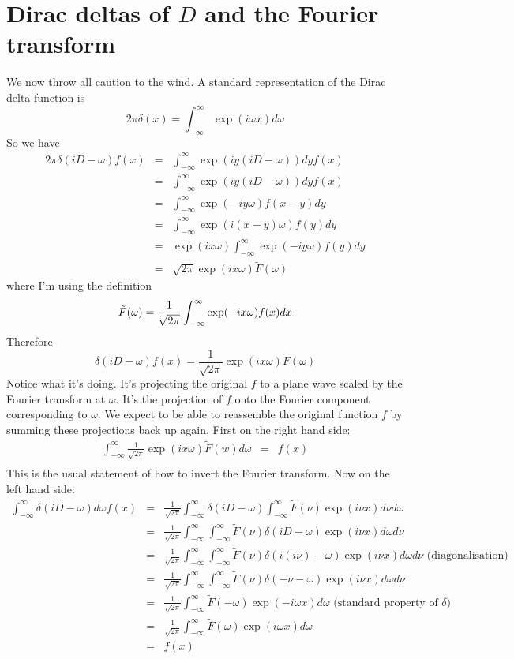 \documentclass[a4paper]{article}
\theoremstyle{definition}
\begin{document}
\section{Dirac deltas of $D$ and the Fourier transform}
We now throw all caution to the wind.
A standard representation of the Dirac delta function is
\[
2\pi\delta(x) = \int_{-\infty}^\infty \exp(i\omega x)d\omega
\]
So we have
\begin{eqnarray*}
2\pi\delta(iD-\omega)f(x) & = & \int_{-\infty}^\infty\exp(iy(iD-\omega))dyf(x) \\
& = & \int_{-\infty}^\infty\exp(iy(iD-\omega))dyf(x) \\
& = & \int_{-\infty}^\infty\exp(-iy\omega)f(x-y)dy \\
& = & \int_{-\infty}^\infty\exp(i(x-y)\omega)f(y)dy \\
& = & \exp(ix\omega)\int_{-\infty}^\infty\exp(-iy\omega)f(y)dy \\
& = & \sqrt{2\pi}\exp(ix\omega)\tilde{F}(\omega)
\end{eqnarray*}
where I'm using the definition
\[
\tilde{F}(\omega) = \frac{1}{\sqrt{2\pi}}\int_{-\infty}^\infty\exp(-ix\omega)f(x)dx \\
\]
Therefore
\[
\delta(iD-\omega)f(x) = \frac{1}{\sqrt{2\pi}}\exp(ix\omega)\tilde{F}(\omega)
\]
Notice what it's doing.
It's projecting the original $f$ to a plane wave scaled by the Fourier transform at $\omega$.
It's the projection of $f$ onto the Fourier component corresponding to $\omega$.
We expect to be able to reassemble the original function $f$ by summing these projections back up again.
First on the right hand side:
\begin{eqnarray*}
\int_{-\infty}^\infty\frac{1}{\sqrt{2\pi}}\exp(ix\omega)\tilde{F}(w)d\omega & = & f(x) \\
\end{eqnarray*}
This is the usual statement of how to invert the Fourier transform.
Now on the left hand side:
\begin{eqnarray*}
\int_{-\infty}^\infty\delta(iD-\omega)d\omega f(x) & = &
\frac{1}{\sqrt{2\pi}}\int_{-\infty}^\infty\delta(iD-\omega)\int_{-\infty}^\infty\tilde{F}(\nu)\exp(i\nu x)d\nu d\omega \\
& = & \frac{1}{\sqrt{2\pi}}\int_{-\infty}^\infty\int_{-\infty}^\infty\tilde{F}(\nu)\delta(iD-\omega)\exp(i\nu x)d\omega d\nu \\
& = & \frac{1}{\sqrt{2\pi}}\int_{-\infty}^\infty\int_{-\infty}^\infty\tilde{F}(\nu)\delta(i(i\nu)-\omega)\exp(i\nu x)d\omega d\nu \mbox{ (diagonalisation)}\\
& = & \frac{1}{\sqrt{2\pi}}\int_{-\infty}^\infty\int_{-\infty}^\infty\tilde{F}(\nu)\delta(-\nu-\omega)\exp(i\nu x)d\omega d\nu \\
& = & \frac{1}{\sqrt{2\pi}}\int_{-\infty}^\infty\tilde{F}(-\omega)\exp(-i\omega x)d\omega \mbox{ (standard property of $\delta$)} \\
& = & \frac{1}{\sqrt{2\pi}}\int_{-\infty}^\infty\tilde{F}(\omega)\exp(i\omega x)d\omega \\
& = & f(x) \\
\end{eqnarray*}
\end{document}
